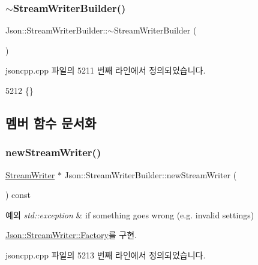 \subsubsection{\texorpdfstring{$\sim$\+Stream\+Writer\+Builder()}{~StreamWriterBuilder()}}
{\footnotesize\ttfamily Json\+::\+Stream\+Writer\+Builder\+::$\sim$\+Stream\+Writer\+Builder (\begin{DoxyParamCaption}{ }\end{DoxyParamCaption})}



jsoncpp.\+cpp 파일의 5211 번째 라인에서 정의되었습니다.


\begin{DoxyCode}
5212 \{\}
\end{DoxyCode}


\subsection{멤버 함수 문서화}
\mbox{\label{class_json_1_1_stream_writer_builder_ab9ee278609f88ae04a7c1a84e1f559e6}} 
\subsubsection{\texorpdfstring{new\+Stream\+Writer()}{newStreamWriter()}}
{\footnotesize\ttfamily \hyperlink{class_json_1_1_stream_writer}{Stream\+Writer} $\ast$ Json\+::\+Stream\+Writer\+Builder\+::new\+Stream\+Writer (\begin{DoxyParamCaption}{ }\end{DoxyParamCaption}) const\hspace{0.3cm}{\ttfamily [virtual]}}


\begin{DoxyExceptions}{예외}
{\em std\+::exception} & if something goes wrong (e.\+g. invalid settings) \\
\hline
\end{DoxyExceptions}


\hyperlink{class_json_1_1_stream_writer_1_1_factory_a9d30ec53e8288cd53befccf1009c5f31}{Json\+::\+Stream\+Writer\+::\+Factory}를 구현.



jsoncpp.\+cpp 파일의 5213 번째 라인에서 정의되었습니다.


